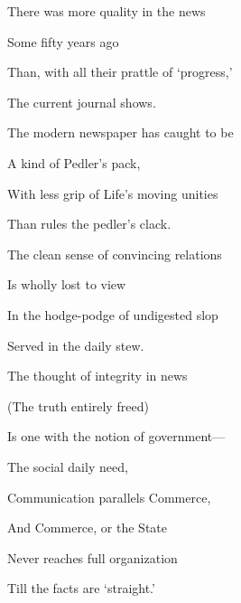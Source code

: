 \documentclass[twoside,symmetric,nobib,justified]{tufte-book}
\begin{document}
\begin{Large}

\noindent There was more quality in the news

\noindent\hspace{.15in} Some fifty years ago

\noindent Than, with all their prattle of `progress,'

\noindent\hspace{.15in} The current journal shows.

\vspace{.1in}

\noindent The modern newspaper has caught to be

\noindent\hspace{.15in} A kind of Pedler's pack,


\noindent With less grip of Life's moving unities

\noindent\hspace{.15in} Than rules the pedler's clack.

\vspace{.1in}

\noindent The clean sense of convincing relations

\noindent\hspace{.15in} Is wholly lost to view

\noindent In the hodge-podge of undigested slop

\noindent\hspace{.15in} Served in the daily stew.

\vspace{.1in}

\noindent The thought of integrity in news

\noindent\hspace{.15in} (The truth entirely freed)

\noindent Is one with the notion of government---

\noindent\hspace{.15in} The social daily need,

\vspace{.1in}

\noindent Communication parallels Commerce,

\noindent\hspace{.15in} And Commerce, or the State

\noindent Never reaches full organization

\noindent\hspace{.15in} Till the facts are `straight.'

\end{Large}
\end{document}
